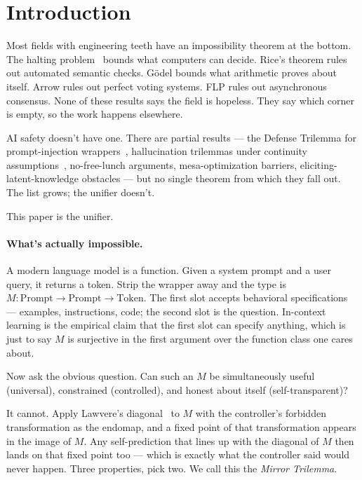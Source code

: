 \section{Introduction}
\label{sec:intro}

Most fields with engineering teeth have an impossibility theorem at the bottom. The halting problem~\citep{turing1936} bounds what computers can decide. Rice's theorem rules out automated semantic checks. G\"odel \citep{goedel1931} bounds what arithmetic proves about itself. Arrow rules out perfect voting systems. FLP rules out asynchronous consensus. None of these results says the field is hopeless. They say which corner is empty, so the work happens elsewhere.

AI safety doesn't have one. There are partial results --- the Defense Trilemma for prompt-injection wrappers~\citep{anonymous2025defense}, hallucination trilemmas under continuity assumptions~\citep{anonymous2025hallucination}, no-free-lunch arguments, mesa-optimization barriers, eliciting-latent-knowledge obstacles --- but no single theorem from which they fall out. The list grows; the unifier doesn't.

This paper is the unifier.

\paragraph{What's actually impossible.}
A modern language model is a function. Given a system prompt and a user query, it returns a token. Strip the wrapper away and the type is $M : \mathrm{Prompt} \to \mathrm{Prompt} \to \mathrm{Token}$. The first slot accepts behavioral specifications --- examples, instructions, code; the second slot is the question. In-context learning is the empirical claim that the first slot can specify anything, which is just to say $M$ is surjective in the first argument over the function class one cares about.

Now ask the obvious question. Can such an $M$ be simultaneously useful (universal), constrained (controlled), and honest about itself (self-transparent)?

It cannot. Apply Lawvere's diagonal~\citep{lawvere1969} to $M$ with the controller's forbidden transformation as the endomap, and a fixed point of that transformation appears in the image of $M$. Any self-prediction that lines up with the diagonal of $M$ then lands on that fixed point too --- which is exactly what the controller said would never happen. Three properties, pick two. We call this the \emph{Mirror Trilemma}.

